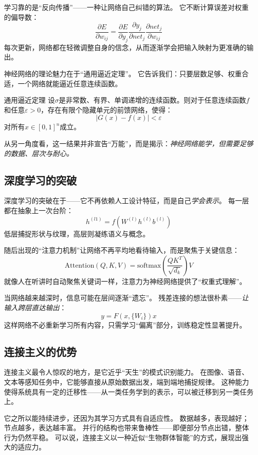 学习靠的是“反向传播”——一种让网络自己纠错的算法。  
它不断计算误差对权重的偏导数：
$$\frac{\partial E}{\partial w_{ij}} = \frac{\partial E}{\partial y_j} \frac{\partial y_j}{\partial net_j} \frac{\partial net_j}{\partial w_{ij}}$$
每次更新，网络都在轻微调整自身的信念，从而逐渐学会把输入映射为更准确的输出。

神经网络的理论魅力在于“通用逼近定理”。  
它告诉我们：只要层数足够、权重合适，一个网络就能逼近任意连续函数。  
\begin{theorem}[]{通用逼近定理}
设$\sigma$是非常数、有界、单调递增的连续函数。则对于任意连续函数$f$和任意$\varepsilon > 0$，存在有限个隐藏单元的前馈网络，使得：
$$\left|G(x) - f(x)\right| < \varepsilon$$
对所有$x \in [0,1]^n$成立。
\end{theorem}
从另一角度看，这一结果并非宣告“万能”，而是揭示：\emph{神经网络能学，但需要足够的数据、层次与耐心。}

\subsection{深度学习的突破}

深度学习的突破在于——它不再依赖人工设计特征，而是自己\emph{学会表示}。  
每一层都在抽象上一次台阶：
$$h^{(l1)} = f\left(W^{(l)} h^{(l)}  b^{(l)}\right)$$
低层捕捉形状与纹理，高层则凝练语义与概念。

随后出现的“注意力机制”让网络不再平均地看待输入，而是聚焦于关键信息：  
$$\text{Attention}(Q, K, V) = \text{softmax}\left(\frac{QK^T}{\sqrt{d_k}}\right)V$$
就像人在听讲时自动聚焦关键词一样，注意力为神经网络提供了“权重式理解”。

当网络越来越深时，信息可能在层间逐渐“遗忘”。  
残差连接的想法很朴素——\emph{让输入跨层直达输出}：
$$y = F(x, \{W_i\})  x$$
这样网络不必重新学习所有内容，只需学习“偏离”部分，训练稳定性显著提升。

\subsection{连接主义的优势}

连接主义最令人惊叹的地方，是它近乎“天生”的模式识别能力。  
在图像、语音、文本等感知任务中，它能够直接从原始数据出发，端到端地捕捉规律。  
这种能力使得系统具有一定的迁移性——从一类任务学到的表示，可以被迁移到另一类任务上。

它之所以能持续进步，还因为其学习方式具有自适应性。  
数据越多，表现越好；节点越多，表达越丰富。  
并行的结构也带来鲁棒性——即便部分节点出错，整体行为仍然平稳。  
可以说，连接主义以一种近似“生物群体智能”的方式，展现出强大的适应力。

